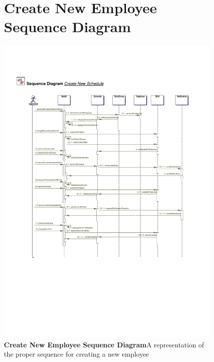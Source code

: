 \documentclass[letterpaper,12pt]{report}
\begin{document}
\begin{figure}[hbp]
 \section{Create New Employee Sequence Diagram}
 \includegraphics[scale=0.65]{externals/SequenceDiagrams4.pdf}
 \caption{\small
\textbf{Create New Employee Sequence Diagram}\newline A representation of the proper sequence for creating a new employee}\label{fig:seqCreateNewEmp}
\end{figure}
\newpage
\end{document}
